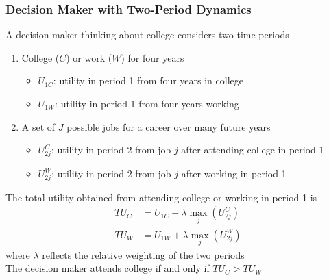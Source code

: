 \documentclass{beamer}
\begin{document}
\begin{frame}\frametitle{Decision Maker with Two-Period Dynamics}
    A decision maker thinking about college considers two time periods
    \begin{enumerate}
        \item College ($C$) or work ($W$) for four years
        \begin{itemize}
            \item $U_{1C}$: utility in period 1 from four years in college
            \item $U_{1W}$: utility in period 1 from four years working
        \end{itemize}
        \item A set of $J$ possible jobs for a career over many future years
        \begin{itemize}
            \item $U_{2j}^C$: utility in period 2 from job $j$ after attending college in period 1
            \item $U_{2j}^W$: utility in period 2 from job $j$ after working in period 1
        \end{itemize}
    \end{enumerate}
    \vspace{2ex}
    The total utility obtained from attending college or working in period 1 is
    \begin{align*}
        TU_C & = U_{1C} + \lambda \max_j(U_{2j}^C) \\
        TU_W & = U_{1W} + \lambda \max_j(U_{2j}^W)
    \end{align*}
    where $\lambda$ reflects the relative weighting of the two periods \\
    \vspace{2ex}
    The decision maker attends college if and only if $TU_C > TU_W$
\end{frame}
\end{document}
